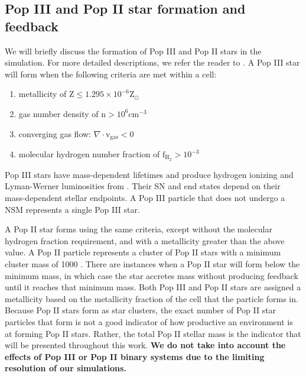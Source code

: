\documentclass[fleqn,usenatbib]{mnras}
\begin{document}
\subsection{Pop III and Pop II star formation and feedback} \label{sec:star_formation}
We will briefly discuss the formation of Pop III and Pop II stars in the simulation. For more detailed descriptions, we refer the reader to \citet{Skinner20}. A Pop III star will form when the following criteria are met within a cell: 
\begin{enumerate}
	\item metallicity of $\mathrm{Z} \leq 1.295 \times 10^{-6} \mathrm{Z}_{\odot}$
	\item gas number density of $\mathrm{n} > 10^{6} \mathrm{cm}^{-3}$
	\item converging gas flow: $\nabla \cdot \mathrm{v}_{\mathrm{gas}} < 0$
	\item molecular hydrogen number fraction of $\mathrm{f}_{\mathrm{H}_{2}} > 10^{-3}$
\end{enumerate}
Pop III stars have mass-dependent lifetimes and produce hydrogen ionizing and Lyman-Werner luminosities from \citet{Schaerer02}. Their SN and end states depend on their mass-dependent stellar endpoints. A Pop III particle that does not undergo a NSM represents a single Pop III star. 

A Pop II star forms using the same criteria, except without the molecular hydrogen fraction requirement, and with a metallicity greater than the above value. A Pop II particle represents a cluster of Pop II stars with a minimum cluster mass of 1000 \Ms. There are instances when a Pop II star will form below the minimum mass, in which case the star accretes mass without producing feedback until it reaches that minimum mass. Both Pop III and Pop II stars are assigned a metallicity based on the metallicity fraction of the cell that the particle forms in. Because Pop II stars form as star clusters, the exact number of Pop II star particles that form is not a good indicator of how productive an environment is at forming Pop II stars. Rather, the total Pop II stellar mass is the indicator that will be presented throughout this work. \textbf{We do not take into account the effects of Pop III or Pop II binary systems due to the limiting resolution of our simulations.}


\end{document}
